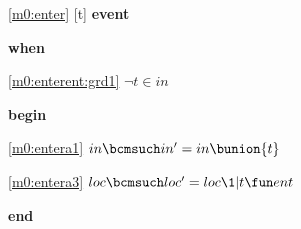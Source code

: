 \noindent \ref{m0:enter} [t] \textbf{event}
\begin{block}
  \item   \textbf{when}
  \begin{block}
  \item[ \eqref{m0:enterent:grd1} ]$\neg t \in in $ %
  \end{block}
  \item   \textbf{begin}
  \begin{block}
  \item[ \eqref{m0:entera1} ]$in \bcmsuch in' = in \bunion \{ t \} $ %
  \item[ \eqref{m0:entera3} ]$loc \bcmsuch loc' = loc \1| t \fun ent $ %
  \end{block}
  \item   \textbf{end} \\
\end{block}
